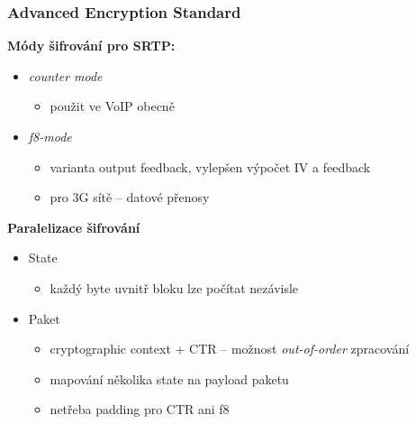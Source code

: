 \documentclass[10pt, xcolor=pdflatex, dvipsnames, table]{beamer}
\begin{document}
\begin{frame}
\frametitle{Advanced Encryption Standard}
\textbf{Módy šifrování pro SRTP:} 
\begin{itemize}
\item \textit{counter mode}
    \begin{itemize}
        \item použit ve VoIP obecně
    \end{itemize}
\item \textit{f8-mode} 
\begin{itemize}
    \item varianta output feedback, vylepšen výpočet IV a feedback
    \item pro 3G sítě -- datové přenosy
\end{itemize}
\end{itemize}

\vspace{1em}

\textbf{Paralelizace šifrování}

\begin{itemize}
\item State 
    \begin{itemize}
    \item každý byte uvnitř bloku lze počítat nezávisle
    \end{itemize}
\item Paket
    \begin{itemize}
    \item cryptographic context + CTR -- možnost \textit{out-of-order} zpracování
    \item mapování několika state na payload paketu
    \item netřeba padding pro CTR ani f8
    \end{itemize}
\end{itemize}


\end{frame}
\end{document}
